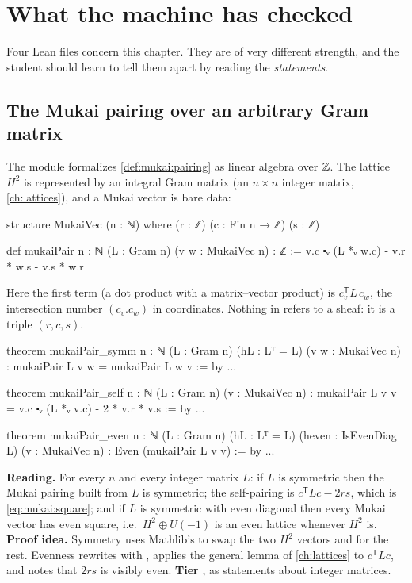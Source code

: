 \section{What the machine has checked}\label{sec:mukai:lean}

Four Lean files concern this chapter. They are of very different strength, and the student should
learn to tell them apart by reading the \emph{statements}.

\subsection{The Mukai pairing over an arbitrary Gram matrix}
The module  formalizes \cref{def:mukai:pairing} as
linear algebra over $\mathbb{Z}$. The lattice $H^2$ is represented by an integral Gram matrix
 (an $n\times n$ integer matrix, \cref{ch:lattices}), and a Mukai vector is bare
data:
\begin{leancode}
structure MukaiVec (n : ℕ) where
  (r : ℤ)
  (c : Fin n → ℤ)
  (s : ℤ)

def mukaiPair {n : ℕ} (L : Gram n) (v w : MukaiVec n) : ℤ :=
  v.c ⬝ᵥ (L *ᵥ w.c) - v.r * w.s - v.s * w.r
\end{leancode}
Here the first term (a dot product with a matrix--vector product) is $c_v^{\mathsf T}L\,c_w$, the intersection number $(c_v.c_w)$ in
coordinates. Nothing in  refers to a sheaf: it is a triple $(r,c,s)$.

\begin{leanbox}
\begin{leancode}
theorem mukaiPair_symm {n : ℕ} (L : Gram n) (hL : Lᵀ = L)
    (v w : MukaiVec n) : mukaiPair L v w = mukaiPair L w v := by ...

theorem mukaiPair_self {n : ℕ} (L : Gram n) (v : MukaiVec n) :
    mukaiPair L v v = v.c ⬝ᵥ (L *ᵥ v.c) - 2 * v.r * v.s := by ...

theorem mukaiPair_even {n : ℕ} (L : Gram n) (hL : Lᵀ = L)
    (heven : IsEvenDiag L) (v : MukaiVec n) :
    Even (mukaiPair L v v) := by ...
\end{leancode}
\textbf{Reading.} For every $n$ and every integer matrix $L$: if $L$ is symmetric then the Mukai
pairing built from $L$ is symmetric; the self-pairing is $c^{\mathsf T}Lc-2rs$, which is
\eqref{eq:mukai:square}; and if $L$ is symmetric with even diagonal then every Mukai vector has
even square, i.e.\ $H^2\oplus U(-1)$ is an even lattice whenever $H^2$ is. \textbf{Proof idea.}
Symmetry uses Mathlib's  to swap the two $H^2$
vectors and  for the rest. Evenness rewrites with , applies the
general lemma  of \cref{ch:lattices} to
$c^{\mathsf T}Lc$, and notes that $2rs$ is visibly even. \textbf{Tier} \TA, as statements about
integer matrices.
\end{leanbox}

